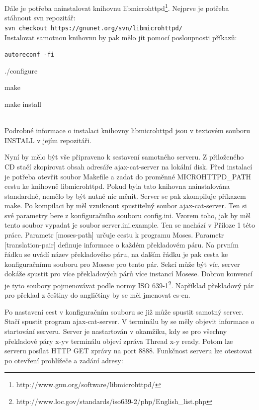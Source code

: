 \documentclass[12pt,a4paper]{report}
\begin{document}
Dále je potřeba nainstalovat knihovnu libmicrohttpd\footnote{http://www.gnu.org/software/libmicrohttpd/}. Nejprve je potřeba stáhnout svn repozitář: \\


{\tt svn checkout https://gnunet.org/svn/libmicrohttpd/ } \\


Instalovat samotnou knihovnu by pak mělo jít pomocí posloupnosti příkazů: \\


{\tt autoreconf -fi

./configure

make

make install} \\

Podrobné informace o instalaci knihovny libmicrohttpd jsou v textovém souboru INSTALL v jejím repozitáři.

Nyní by mělo být vše připraveno k sestavení samotného serveru. Z přiloženého CD stačí zkopírovat obsah adresáře ajax-cat-server na lokální disk. Před instalací je potřeba otevřít soubor Makefile a zadat do proměnné MICROHTTPD\_PATH cestu ke knihovně libmicrohttpd. Pokud byla tato knihovna nainstalována standardně, nemělo by být nutné nic měnit. Server se pak zkompiluje příkazem make. Po kompilaci by měl vzniknout spustitelný soubor ajax-cat-server. Ten si své parametry bere z konfiguračního souboru config.ini. Vzorem toho, jak by měl tento soubor vypadat je soubor server.ini.example. Ten se nachází v Příloze 1 této práce. Parametr [moses-path] určuje cestu k programu Moses. Parametr [translation-pair] definuje informace o každém překladovém páru. Na prvním řádku se uvádí název překladového páru, na dalším řádku je pak cesta ke konfiguračnímu souboru pro Mosese pro tento pár. Sekcí může být víc, server dokáže spustit pro více překladových párů více instancí Mosese. Dobrou konvencí je tyto soubory pojmenovávat podle normy ISO 639-1\footnote{http://www.loc.gov/standards/iso639-2/php/English\_list.php}. Například překladový pár pro překlad z češtiny do angličtiny by se měl jmenovat \clqq cs-en\crqq .

Po nastavení cest v konfiguračním souboru se již může spustit samotný server. Stačí spustit program ajax-cat-server. V terminálu by se měly objevit informace o startování serveru. Server je nastartován v okamžiku, kdy se pro všechny překladové páry \clqq x-y\crqq  v terminálu objeví zpráva \clqq Thread x-y ready\crqq . Potom lze serveru posílat HTTP GET zprávy na port 8888. Funkčnost serveru lze otestovat po otevření prohlížeče a zadání adresy: \\
\end{document}
